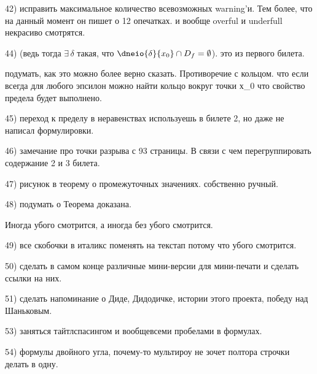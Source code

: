 42) исправить максимальное количество всевозможных warning'и. Тем более, что на данный момент он пишет о 12 опечатках. и вообще overful и underfull некрасиво смотрятся.


44) (ведь тогда $\exists\, \delta$ такая, что $\dneio{\delta}{x_0}\cap D_f=\emptyset$). это из первого билета.

подумать, как это можно более верно сказать. Противоречие с кольцом. что если всегда для любого эпсилон можно найти кольцо вокруг точки х_0 что свойство предела будет выполнено.

45) переход к пределу в неравенствах используешь в билете 2, но даже не написал формулировки.

46) замечание про точки разрыва с 93 страницы. В связи с чем перегруппировать содержание 2 и 3 билета.

47) рисунок в теорему о промежуточных значениях. собственно ручный.

48) подумать о \noindent Теорема доказана. 

Иногда убого смотрится, а иногда без \noindent убого смотрится.

49) все скобочки в италикс поменять на текстап потому что убого смотрится.

50) сделать в самом конце различные мини-версии для мини-печати и сделать ссылки на них.

51) сделать напоминание о Диде, Дидодичке, истории этого проекта, победу над Шаньковым.

53) заняться тайтлспасингом и вообщевсеми пробелами в формулах.

54) формулы двойного угла, почему-то мультироу не зочет полтора строчки делать в одну.